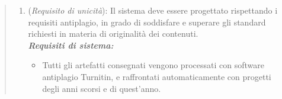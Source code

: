 \begin{quote}
\begin{enumerate}[label=\textit{RO\arabic*}]
  \item (\textit{Requisito di unicità}): Il sistema deve essere progettato rispettando i requisiti antiplagio, in grado di soddisfare e superare gli standard richiesti in materia di originalità dei contenuti. \\
  \textbf{\textit{Requisiti di sistema:}} 
    \begin{itemize}
        \item Tutti gli artefatti consegnati vengono processati con software antiplagio Turnitin, e raffrontati automaticamente con progetti degli anni scorsi e di quest’anno.
    \end{itemize}
\end{enumerate} 
\end{quote}